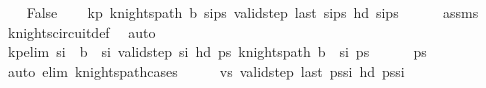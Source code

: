 \begin{isabellebody}
\isanewline
\ \ \isamarkupfalse%
\ False\isanewline
\ \ \isamarkupfalse%
\ kp{}{\isacharcolon}{\kern0pt}\ {\isachardoublequoteopen}knights{\isacharunderscore}{\kern0pt}path\ b\ {\isacharparenleft}{\kern0pt}s\isactrlsub i{\isacharhash}{\kern0pt}ps{\isacharparenright}{\kern0pt}{\isachardoublequoteclose}\ {\isachardoublequoteopen}valid{\isacharunderscore}{\kern0pt}step\ {\isacharparenleft}{\kern0pt}last\ {\isacharparenleft}{\kern0pt}s\isactrlsub i{\isacharhash}{\kern0pt}ps{\isacharparenright}{\kern0pt}{\isacharparenright}{\kern0pt}\ {\isacharparenleft}{\kern0pt}hd\ {\isacharparenleft}{\kern0pt}s\isactrlsub i{\isacharhash}{\kern0pt}ps{\isacharparenright}{\kern0pt}{\isacharparenright}{\kern0pt}{\isachardoublequoteclose}\isanewline
\ \ \ \ \isamarkupfalse%
\ assms\ \isamarkupfalse%
\ knights{\isacharunderscore}{\kern0pt}circuit{\isacharunderscore}{\kern0pt}def\ \isamarkupfalse%
\ auto\isanewline
\ \ \isamarkupfalse%
\ \isamarkupfalse%
\ kp{\isacharunderscore}{\kern0pt}elim{\isacharcolon}{\kern0pt}\ {\isachardoublequoteopen}s\isactrlsub i\ {\isasymnotin}\ {\isacharparenleft}{\kern0pt}b\ {\isacharminus}{\kern0pt}\ {\isacharbraceleft}{\kern0pt}s\isactrlsub i{\isacharbraceright}{\kern0pt}{\isacharparenright}{\kern0pt}{\isachardoublequoteclose}\ {\isachardoublequoteopen}valid{\isacharunderscore}{\kern0pt}step\ s\isactrlsub i\ {\isacharparenleft}{\kern0pt}hd\ ps{\isacharparenright}{\kern0pt}{\isachardoublequoteclose}\ {\isachardoublequoteopen}knights{\isacharunderscore}{\kern0pt}path\ {\isacharparenleft}{\kern0pt}b\ {\isacharminus}{\kern0pt}\ {\isacharbraceleft}{\kern0pt}s\isactrlsub i{\isacharbraceright}{\kern0pt}{\isacharparenright}{\kern0pt}\ ps{\isachardoublequoteclose}\isanewline
\ \ \ \ \isamarkupfalse%
\ {\isacartoucheopen}ps\ {\isasymnoteq}\ {\isacharbrackleft}{\kern0pt}{\isacharbrackright}{\kern0pt}{\isacartoucheclose}\ \isamarkupfalse%
\ {\isacharparenleft}{\kern0pt}auto\ elim{\isacharcolon}{\kern0pt}\ knights{\isacharunderscore}{\kern0pt}path{\isachardot}{\kern0pt}cases{\isacharparenright}{\kern0pt}\isanewline
\ \ \isamarkupfalse%
\ \isamarkupfalse%
\ vs{\isacharprime}{\kern0pt}{\isacharcolon}{\kern0pt}\ {\isachardoublequoteopen}valid{\isacharunderscore}{\kern0pt}step\ {\isacharparenleft}{\kern0pt}last\ {\isacharparenleft}{\kern0pt}ps{\isacharat}{\kern0pt}{\isacharbrackleft}{\kern0pt}s\isactrlsub i{\isacharbrackright}{\kern0pt}{\isacharparenright}{\kern0pt}{\isacharparenright}{\kern0pt}\ {\isacharparenleft}{\kern0pt}hd\ {\isacharparenleft}{\kern0pt}ps{\isacharat}{\kern0pt}{\isacharbrackleft}{\kern0pt}s\isactrlsub i{\isacharbrackright}{\kern0pt}{\isacharparenright}{\kern0pt}{\isacharparenright}{\kern0pt}{\isachardoublequoteclose}\isanewline

\end{isabellebody}
